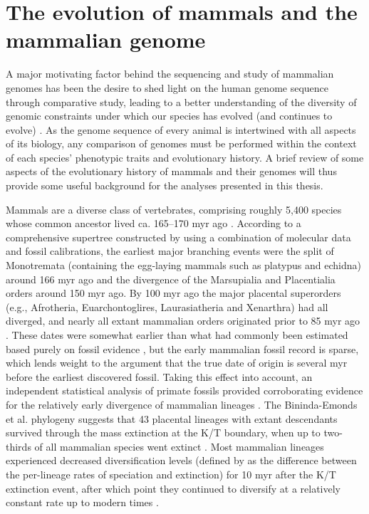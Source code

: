 \section{The evolution of mammals and the mammalian genome}
\label{section_mammal_evolution}

A major motivating factor behind the sequencing and study of mammalian
genomes has been the desire to shed light on the human genome sequence
through comparative study, leading to a better understanding of the
diversity of genomic constraints under which our species has evolved
(and continues to evolve) \citep{Mouse2002Initial}. As the genome
sequence of every animal is intertwined with all aspects of its
biology, any comparison of genomes must be performed within the
context of each species' phenotypic traits and evolutionary history. A
brief review of some aspects of the evolutionary history of mammals
and their genomes will thus provide some useful background for the
analyses presented in this thesis.

Mammals are a diverse class of vertebrates, comprising roughly 5,400
species whose common ancestor lived ca. 165--170 \ac{myr} ago
\citep{Wilson2005}. According to a comprehensive supertree constructed
by \citet{BinindaEmonds2007} using a combination of molecular data and
fossil calibrations, the earliest major branching events were the
split of Monotremata (containing the egg-laying mammals such as
platypus and echidna) around 166 \ac{myr} ago and the divergence of
the Marsupialia and Placentialia orders around 150 \ac{myr} ago. By
100 \ac{myr} ago the major placental superorders (e.g., Afrotheria,
Euarchontoglires, Laurasiatheria and Xenarthra) had all diverged, and
nearly all extant mammalian orders originated prior to 85 \ac{myr} ago
\citep{BinindaEmonds2007}. These dates were somewhat earlier than what
had commonly been estimated based purely on fossil evidence
\citep{Archibald2001}, but the early mammalian fossil record is
sparse, which lends weight to the argument that the true date of
origin is several \ac{myr} before the earliest discovered
fossil. Taking this effect into account, an independent statistical
analysis of primate fossils provided corroborating evidence for the
relatively early divergence of mammalian lineages
\citep{Martin2007}. The Bininda-Emonds et al. phylogeny suggests that
43 placental lineages with extant descendants survived through the
mass extinction at the K/T boundary, when up to two-thirds of all
mammalian species went extinct \citep{Alroy1999}. Most mammalian
lineages experienced decreased diversification levels (defined by
\citet{BinindaEmonds2007} as the difference between the per-lineage
rates of speciation and extinction) for 10 \ac{myr} after the K/T
extinction event, after which point they continued to diversify at a
relatively constant rate up to modern times
\citep{BinindaEmonds2007,Martin2007}.

